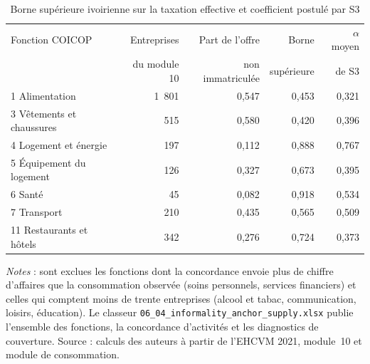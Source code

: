 \documentclass[11pt,a4paper]{article}
\begin{document}
\begin{table}[t]
\centering
\begin{threeparttable}
\caption{Borne supérieure ivoirienne sur la taxation effective et coefficient postulé par S3}
\label{tab:ancrage-offre}
\small
\begin{tabular}{lrrrr}
\toprule
Fonction COICOP & Entreprises & Part de l'offre & Borne & $\alpha$ moyen \\
                & du module 10 & non immatriculée & supérieure & de S3 \\
\midrule
1 Alimentation              & 1~801 & 0,547 & 0,453 & 0,321 \\
3 Vêtements et chaussures   & 515   & 0,580 & 0,420 & 0,396 \\
4 Logement et énergie       & 197   & 0,112 & 0,888 & 0,767 \\
5 Équipement du logement    & 126   & 0,327 & 0,673 & 0,395 \\
6 Santé                     & 45    & 0,082 & 0,918 & 0,534 \\
7 Transport                 & 210   & 0,435 & 0,565 & 0,509 \\
11 Restaurants et hôtels    & 342   & 0,276 & 0,724 & 0,373 \\
\bottomrule
\end{tabular}
\begin{tablenotes}\footnotesize
\item \emph{Notes} : sont exclues les fonctions dont la concordance envoie plus
de chiffre d'affaires que la consommation observée (soins personnels, services
financiers) et celles qui comptent moins de trente entreprises (alcool et tabac,
communication, loisirs, éducation). Le classeur
\texttt{06\_04\_informality\_anchor\_supply.xlsx} publie l'ensemble des
fonctions, la concordance d'activités et les diagnostics de couverture.
Source : calculs des auteurs à partir de l'EHCVM 2021, module~10 et module de
consommation.
\end{tablenotes}
\end{threeparttable}
\end{table}
\end{document}
